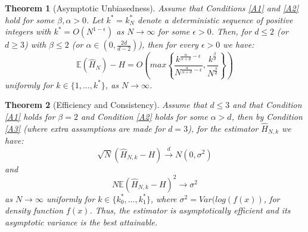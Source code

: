 \documentclass[12pt]{report}
\newtheorem{theorem}{Theorem}
\begin{document}
\begin{theorem}[Asymptotic Unbiasedness] \label{unbias}
Assume that Conditions \ref{A1} and \ref{A2} hold for some $\beta, \alpha > 0$. Let  $k^{*} = k_{N}^{*}$ denote a deterministic sequence of positive integers with $k^{*} = O(N^{1-\epsilon})$ as $N \to \infty$  for some $\epsilon > 0$. Then, for $d \leq 2$ (or $d \geq 3$) with $\beta \leq 2$ (or $\alpha \in (0, \frac{2d}{d-2})$), then for every $\epsilon >0$ we have:
\begin{equation} \label{unbias_equation}
\mathbb{E} ( \hat{H}_{N} ) - H = O \left( max \left\{ \frac{k^{\frac{\alpha}{\alpha + d} - \epsilon}}{N^{\frac{\alpha}{\alpha + d} - \epsilon}}, \frac{k^{\frac{\beta}{d}}}{N^{\frac{\beta}{d}}} \right\} \right)
\end{equation}
uniformly for $k \in \{1, ..., k^{*}\}$, as $N \to \infty$.
\end{theorem}


\begin{theorem}[Efficiency and Consistency] \label{efficient}
Assume that $d \leq 3$ and that Condition \ref{A1} holds for $\beta = 2$ and Condition \ref{A2} holds for some $\alpha > d$, then by Condition \ref{A3} (where extra assumptions are made for $d=3$), for the estimator $\hat{H}_{N, k}$ we have:
\begin{equation} \label{efficiency_equation}
\sqrt{N}(\hat{H}_{N, k} - H) \xrightarrow{d} N(0, \sigma^2)
\end{equation}
and 
\begin{equation} \label{consistency_equation}
N \mathbb{E}{(\hat{H}_{N, k} - H)^2} \xrightarrow{} \sigma^2
\end{equation}
as $N \to \infty$ uniformly for $k \in \{ k_{0}^{*}, ...,  k_{1}^{*} \}$, where $\sigma^2 = Var(log(f(x))$, for density function $f(x)$. Thus, the estimator is asymptotically efficient and its asymptotic variance is the best attainable.
\end{theorem}
\end{document}
